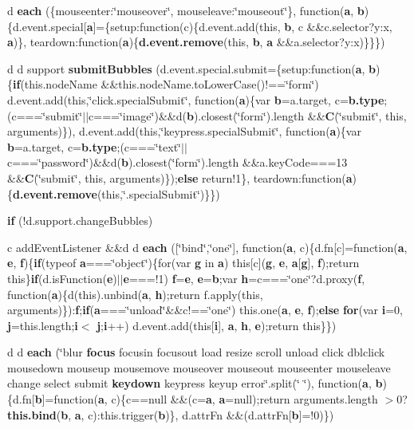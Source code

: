 \begin{DoxyCompactItemize}
\item 
d {\bf each} (\{mouseenter\-:\char`\"{}mouseover\char`\"{}, mouseleave\-:\char`\"{}mouseout\char`\"{}\}, function({\bf a}, {\bf b})\{d.\-event.\-special[{\bf a}]=\{setup\-:function(c)\{d.\-event.\-add(this, {\bf b}, c \&\&c.\-selector?y\-:x, {\bf a})\}, teardown\-:function({\bf a})\{{\bf d.\-event.\-remove}(this, {\bf b}, {\bf a} \&\&a.\-selector?y\-:x)\}\}\})
\item 
d d support {\bf submit\-Bubbles} (d.\-event.\-special.\-submit=\{setup\-:function({\bf a}, {\bf b})\{{\bf if}(this.\-node\-Name \&\&this.\-node\-Name.\-to\-Lower\-Case()!==\char`\"{}form\char`\"{}) d.\-event.\-add(this,\char`\"{}click.\-special\-Submit\char`\"{}, function({\bf a})\{var {\bf b}=a.\-target, c={\bf b.\-type};(c===\char`\"{}submit\char`\"{}$|$$|$c===\char`\"{}image\char`\"{})\&\&d({\bf b}).closest(\char`\"{}form\char`\"{}).length \&\&{\bf C}(\char`\"{}submit\char`\"{}, this, arguments)\}), d.\-event.\-add(this,\char`\"{}keypress.\-special\-Submit\char`\"{}, function({\bf a})\{var {\bf b}=a.\-target, c={\bf b.\-type};(c===\char`\"{}text\char`\"{}$|$$|$c===\char`\"{}password\char`\"{})\&\&d({\bf b}).closest(\char`\"{}form\char`\"{}).length \&\&a.\-key\-Code===13 \&\&{\bf C}(\char`\"{}submit\char`\"{}, this, arguments)\});{\bf else} return!1\}, teardown\-:function({\bf a})\{{\bf d.\-event.\-remove}(this,\char`\"{}.special\-Submit\char`\"{})\}\})
\item 
{\bf if} (!d.\-support.\-change\-Bubbles)
\item 
c add\-Event\-Listener \&\&d d {\bf each} ([\char`\"{}bind\char`\"{},\char`\"{}one\char`\"{}], function({\bf a}, c)\{d.\-fn[c]=function({\bf a}, {\bf e}, {\bf f})\{{\bf if}(typeof {\bf a}===\char`\"{}object\char`\"{})\{for(var {\bf g} in {\bf a}) this[c]({\bf g}, {\bf e}, {\bf a}[{\bf g}], {\bf f});return this\}{\bf if}(d.\-is\-Function({\bf e})$|$$|${\bf e}===!1) {\bf f}={\bf e}, {\bf e}={\bf b};var {\bf h}=c===\char`\"{}one\char`\"{}?d.\-proxy({\bf f}, function({\bf a})\{d(this).unbind({\bf a}, {\bf h});return f.\-apply(this, arguments)\})\-:{\bf f};{\bf if}({\bf a}===\char`\"{}unload\char`\"{}\&\&c!==\char`\"{}one\char`\"{}) this.\-one({\bf a}, {\bf e}, {\bf f});{\bf else} {\bf for}(var {\bf i}=0, {\bf j}=this.\-length;{\bf i}$<$ {\bf j};{\bf i}++) d.\-event.\-add(this[{\bf i}], {\bf a}, {\bf h}, {\bf e});return this\}\})
\item 
d d {\bf each} (\char`\"{}blur {\bf focus} focusin focusout load resize scroll unload click dblclick mousedown mouseup mousemove mouseover mouseout mouseenter mouseleave change select submit {\bf keydown} keypress keyup error\char`\"{}.split(\char`\"{} \char`\"{}), function({\bf a}, {\bf b})\{d.\-fn[{\bf b}]=function({\bf a}, c)\{c==null \&\&(c={\bf a}, {\bf a}=null);return arguments.\-length $>$0?{\bf this.\-bind}({\bf b}, {\bf a}, c)\-:this.\-trigger({\bf b})\}, d.\-attr\-Fn \&\&(d.\-attr\-Fn[{\bf b}]=!0)\})
$$
\end{DoxyCompactItemize}
